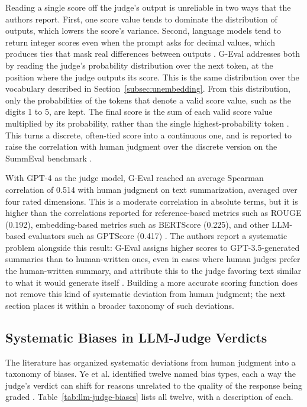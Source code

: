 Reading a single score off the judge's output is unreliable in two ways that the authors report. First, one score value tends to dominate the distribution of outputs, which lowers the score's variance. Second, language models tend to return integer scores even when the prompt asks for decimal values, which produces ties that mask real differences between outputs \cite{liuGEvalNLGEvaluation2023}. G-Eval addresses both by reading the judge's probability distribution over the next token, at the position where the judge outputs its score. This is the same distribution over the vocabulary described in Section~\ref{subsec:unembedding}. From this distribution, only the probabilities of the tokens that denote a valid score value, such as the digits 1 to 5, are kept. The final score is the sum of each valid score value multiplied by its probability, rather than the single highest-probability token \cite{liuGEvalNLGEvaluation2023}. This turns a discrete, often-tied score into a continuous one, and is reported to raise the correlation with human judgment over the discrete version on the SummEval benchmark \cite{liuGEvalNLGEvaluation2023}.

With GPT-4 as the judge model, G-Eval reached an average Spearman correlation of 0.514 with human judgment on text summarization, averaged over four rated dimensions. This is a moderate correlation in absolute terms, but it is higher than the correlations reported for reference-based metrics such as ROUGE (0.192), embedding-based metrics such as BERTScore (0.225), and other LLM-based evaluators such as GPTScore (0.417) \cite{liuGEvalNLGEvaluation2023}. The authors report a systematic problem alongside this result: G-Eval assigns higher scores to GPT-3.5-generated summaries than to human-written ones, even in cases where human judges prefer the human-written summary, and attribute this to the judge favoring text similar to what it would generate itself \cite{liuGEvalNLGEvaluation2023}. Building a more accurate scoring function does not remove this kind of systematic deviation from human judgment; the next section places it within a broader taxonomy of such deviations.

\subsection{Systematic Biases in LLM-Judge Verdicts}
\label{sec:llm-as-judge-biases}

The literature has organized systematic deviations from human judgment into a taxonomy of biases. Ye et al. identified twelve named bias types, each a way the judge's verdict can shift for reasons unrelated to the quality of the response being graded \cite{yeJusticePrejudiceQuantifying2024a}. Table~\ref{tab:llm-judge-biases} lists all twelve, with a description of each.

